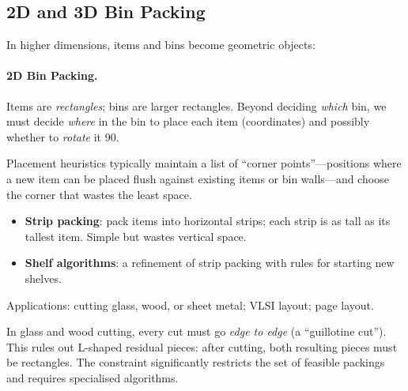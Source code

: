 \subsection{2D and 3D Bin Packing}
\label{ssec:bin-packing-2d3d}

In higher dimensions, items and bins become geometric objects:

\paragraph{2D Bin Packing.}
Items are \emph{rectangles}; bins are larger rectangles.
Beyond deciding \emph{which} bin, we must decide \emph{where}
in the bin to place each item (coordinates) and possibly whether
to \emph{rotate} it 90\textdegree.

Placement heuristics typically maintain a list of ``corner
points''---positions where a new item can be placed flush against
existing items or bin walls---and choose the corner that wastes
the least space.

\begin{itemize}[nosep]
  \item \textbf{Strip packing}: pack items into horizontal
        strips; each strip is as tall as its tallest item.
        Simple but wastes vertical space.
  \item \textbf{Shelf algorithms}: a refinement of strip
        packing with rules for starting new shelves.
\end{itemize}

\noindent
Applications: cutting glass, wood, or sheet metal; VLSI layout;
page layout.

\begin{remark}
In glass and wood cutting, every cut must go \emph{edge to edge}
(a ``guillotine cut'').
This rules out L-shaped residual pieces: after cutting, both
resulting pieces must be rectangles.
The constraint significantly restricts the set of feasible
packings and requires specialised algorithms.
\end{remark}

